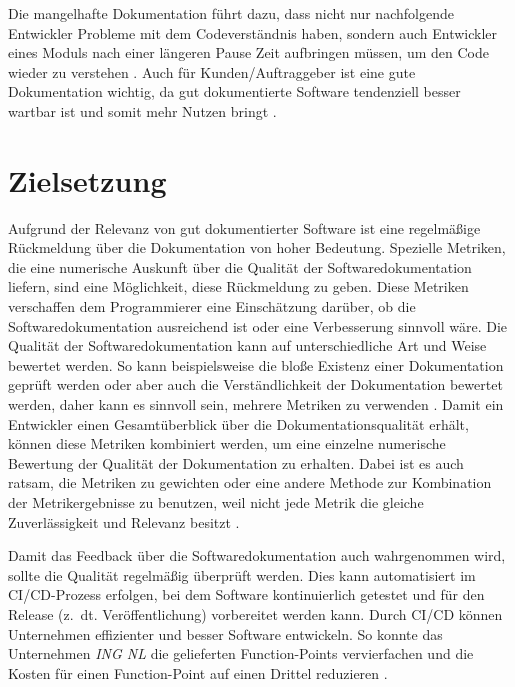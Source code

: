 Die mangelhafte Dokumentation führt dazu, dass nicht nur nachfolgende Entwickler Probleme mit dem Codeverständnis haben, sondern auch Entwickler eines Moduls nach einer längeren Pause Zeit aufbringen müssen, um den Code wieder zu verstehen \cite[S.~511]{vestdam}.  Auch für Kunden/Auftraggeber ist eine gute Dokumentation wichtig, da gut dokumentierte Software tendenziell besser wartbar ist und somit mehr Nutzen bringt \cite[S.~83]{Qualityanalysisofsourcecodecomments} \cite[S.~1]{SoftwareDocumentationManagementIssuesandPractices:ASurvey}.



\section{Zielsetzung}
Aufgrund der Relevanz von gut dokumentierter Software ist eine regelmäßige Rückmeldung über die Dokumentation von hoher Bedeutung. Spezielle Metriken, die eine numerische Auskunft über die Qualität der Softwaredokumentation liefern, sind eine Möglichkeit, diese Rückmeldung zu geben. Diese Metriken verschaffen dem Programmierer eine Einschätzung darüber, ob die Softwaredokumentation ausreichend ist oder eine Verbesserung sinnvoll wäre. Die Qualität der Softwaredokumentation kann auf unterschiedliche Art und Weise bewertet werden. So kann beispielsweise die bloße Existenz einer Dokumentation geprüft werden oder aber auch die Verständlichkeit der Dokumentation bewertet werden, daher kann es sinnvoll sein, mehrere Metriken zu verwenden \cite[S.~29]{pfleeger1992using}. Damit ein Entwickler einen Gesamtüberblick über die Dokumentationsqualität erhält, können diese Metriken kombiniert werden, um eine einzelne numerische Bewertung der Qualität der Dokumentation zu erhalten. 
Dabei ist es auch ratsam, die Metriken zu gewichten oder eine andere Methode zur Kombination der Metrikergebnisse zu benutzen, weil nicht jede Metrik die gleiche Zuverlässigkeit und Relevanz besitzt \cite[S.~1117ff.]{Softwarequalitymetricsaggregationinindustry}.

Damit das Feedback über die Softwaredokumentation auch wahrgenommen wird, sollte die Qualität regelmäßig  überprüft werden. Dies kann automatisiert im \ac{CI/CD}-Prozess erfolgen, bei dem Software kontinuierlich getestet und für den Release (z.~dt. Veröffentlichung) vorbereitet werden kann. Durch CI/CD können Unternehmen effizienter und besser Software entwickeln. So konnte das Unternehmen \textit{ING NL} die gelieferten Function-Points vervierfachen und die Kosten für einen Function-Point auf einen Drittel reduzieren \cite[S.~520]{Vassallo2016}.

